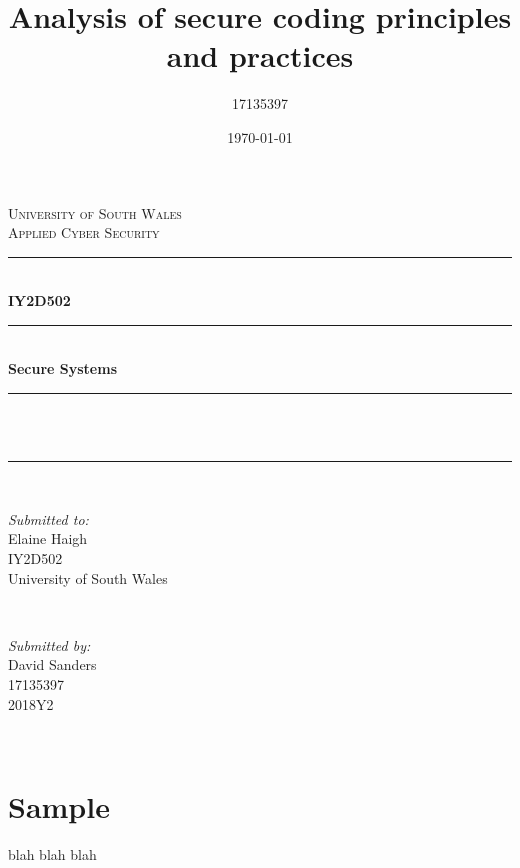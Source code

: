 \documentclass[12pt]{article}
\title{Analysis of secure coding principles and practices}
\author{17135397}
\date{\today}
\makeatletter
\let\thetitle\@title
\makeatother
\begin{document}
\begin{titlepage}
	\centering
  \textsc{\LARGE University of South Wales\\\Large Applied Cyber Security}\\[2cm]

  \rule{\linewidth}{0.2 mm} \\[0.5cm]
  { \huge \bfseries IY2D502}\\
	\rule{\linewidth}{0.2 mm} \\[0.5cm]
	{ \huge \bfseries Secure Systems}\\
	\rule{\linewidth}{0.2 mm} \\[0.5cm]
  \textsc{\Large \thetitle}\\
  \rule{\linewidth}{0.2 mm} \\[2cm]

	\begin{minipage}{0.4\textwidth}
		\begin{flushleft} \large
			\textit{Submitted to:}\\
			Elaine Haigh\\
        IY2D502\\
        University of South Wales\\
			\end{flushleft}
	\end{minipage}~
  \begin{minipage}{0.4\textwidth}
		\begin{flushright} \large
		\textit{Submitted by:} \\
		David Sanders\\
      17135397\\
      2018Y2\\
		\end{flushright}
	\end{minipage}\\[2 cm]

\end{titlepage}


\tableofcontents
\pagebreak


\section{Sample}
blah blah blah
\end{document}
